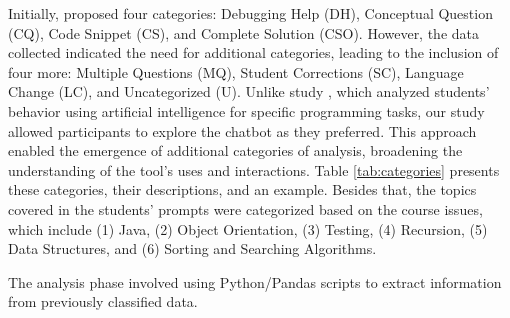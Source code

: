 \documentclass[sn-apa]{sn-jnl} %
\begin{document}
Initially, \cite{Ghimire24} proposed four categories: Debugging Help (DH),
Conceptual Question (CQ), Code Snippet (CS), and Complete Solution (CSO).
However, the data collected indicated the need for additional categories,
leading to the inclusion of four more: Multiple Questions (MQ), Student
Corrections (SC), Language Change (LC), and Uncategorized (U). Unlike study
\cite{Ghimire24}, which analyzed students' behavior using artificial
intelligence for specific programming tasks, our study allowed participants to
explore the chatbot as they preferred. This approach enabled the emergence of
additional categories of analysis, broadening the understanding of the tool's
uses and interactions. Table \ref{tab:categories} presents these categories,
their descriptions, and an example. Besides that, the topics covered in the
students' prompts were categorized based on the course issues, which include
(1) Java, (2) Object Orientation, (3) Testing, (4) Recursion, (5) Data
Structures, and (6) Sorting and Searching Algorithms.

The analysis phase involved using Python/Pandas scripts to extract information
from previously classified data.



\end{document}
